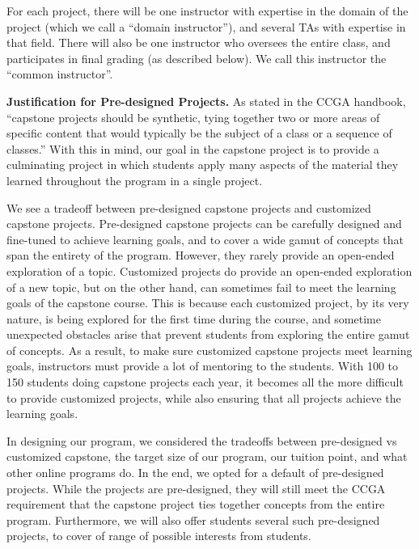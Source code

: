 \documentclass[11pt,letterpaper]{article}
\begin{document}
For each project, there will be one instructor with expertise in the
domain of the project (which we call a “domain instructor”), and
several TAs with expertise in that field. There will also be one
instructor who oversees the entire class, and participates in final
grading (as described below). We call this instructor the “common
instructor”.

{\bf Justification for Pre-designed Projects​.}
As stated in the CCGA handbook, “capstone projects should be
synthetic, tying together two or more areas of specific content that
would typically be the subject of a class or a sequence of classes.”
With this in mind, our goal in the capstone project is to provide a
culminating project in which students apply many aspects of the
material they learned throughout the program in a single project.

We see a tradeoff between pre-designed capstone projects and
customized capstone projects. Pre-designed capstone projects can be
carefully designed and fine-tuned to achieve learning goals, and to
cover a wide gamut of concepts that span the entirety of the program.
However, they rarely provide an open-ended exploration of a topic.
Customized projects do provide an open-ended exploration of a new
topic, but on the other hand, can sometimes fail to meet the learning
goals of the capstone course. This is because each customized project,
by its very nature, is being explored for the first time during the
course, and sometime unexpected obstacles arise that prevent students
from exploring the entire gamut of concepts. As a result, to make sure
customized capstone projects meet learning goals, instructors must
provide a lot of mentoring to the students. With 100 to 150 students
doing capstone projects each year, it becomes all the more difficult
to provide customized projects, while also ensuring that all projects
achieve the learning goals.

In designing our program, we considered the tradeoffs between
pre-designed vs customized capstone, the target size of our program,
our tuition point, and what other online programs do. In the end, we
opted for a default of pre-designed projects. While the projects are
pre-designed, they will still meet the CCGA requirement that the
capstone project ties together concepts from the entire program.
Furthermore, we will also offer students  several ​such pre-designed
projects, to cover of range of possible interests from students.
\end{document}
